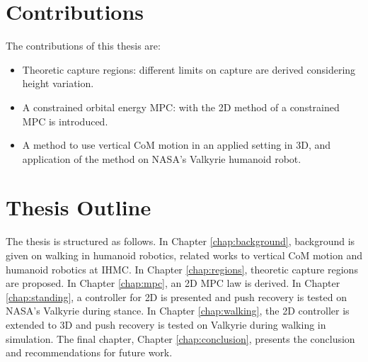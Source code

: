 \section{Contributions}
The contributions of this thesis are:
\begin{itemize}
	\item Theoretic capture regions: different limits on capture are derived considering height variation.
      \item A constrained orbital energy \ac{MPC}: with the \ac{2D} method of \cite{koolen2016balance} a constrained \ac{MPC} is introduced.
	\item A method to use vertical \ac{CoM} motion in an applied setting in \ac{3D}, and application of the method on NASA's Valkyrie humanoid robot.
\end{itemize}
\section{Thesis Outline}
The thesis is structured as follows. In Chapter \ref{chap:background}, background is given on walking in humanoid robotics, related works to vertical \ac{CoM} motion and humanoid robotics at \ac{IHMC}. In Chapter \ref{chap:regions}, theoretic capture regions are proposed. In Chapter \ref{chap:mpc}, an \ac{2D} \ac{MPC} law is derived. In Chapter \ref{chap:standing}, a controller for \ac{2D} is presented and push recovery is tested on NASA's Valkyrie during stance. In Chapter \ref{chap:walking}, the \ac{2D} controller is extended to \ac{3D} and push recovery is tested on Valkyrie during walking in simulation. The final chapter, Chapter \ref{chap:conclusion}, presents the conclusion and recommendations for future work.

